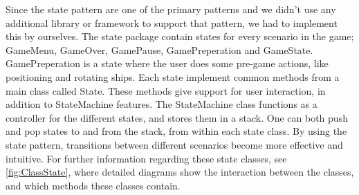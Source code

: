 Since the state pattern are one of the primary patterns and we didn't use any additional library or framework to support that pattern, we had to implement this by ourselves. The state package contain states for every scenario in the game; GameMenu, GameOver, GamePause, GamePreperation and GameState. GamePreperation is a state where the user does some pre-game actions, like positioning and rotating ships. Each state implement common methods from a main class called State. These methods give support for user interaction, in addition to StateMachine features. The StateMachine class functions as a controller for the different states, and stores them in a stack. One can both push and pop states to and from the stack, from within each state class. By using the state pattern, transitions between different scenarios become more effective and intuitive. For further information regarding these state classes, see \ref{fig:ClassState}, where detailed diagrams show the interaction between the classes, and which methods these classes contain.

